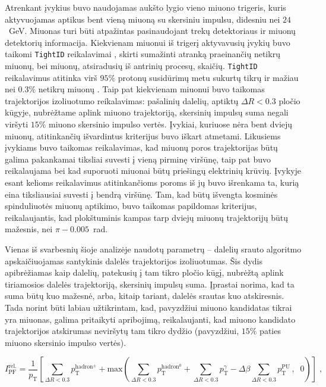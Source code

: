 \documentclass[a4paper, 12pt, oneside]{article}
\newcommand{\ttt}[1]{\texttt{#1}}
\newlength\q
\begin{document}
Atrenkant įvykius buvo naudojamas aukšto lygio vieno miuono trigeris, kuris aktyvuojamas aptikus bent vieną
miuoną su skersiniu impulsu, didesniu nei $24$~GeV.
Miuonas turi būti atpažintas pasinaudojant trekų detektoriaus ir miuonų detektorių informacija.
Kiekvienam miuonui iš trigerį aktyvavusių įvykių buvo taikomi \ttt{TightID} reikalavimai \cite{MuonID}, skirti sumažinti atranką
praeinančių netikrų miuonų, bei miuonų, atsiradusių iš antrinių procesų, skaičių.
\ttt{TightID} reikalavimus atitinka virš $95\%$ protonų susidūrimų metu sukurtų tikrų ir mažiau nei $0.3\%$ netikrų
miuonų \cite{MuonID}.
Taip pat kiekvienam miuonui buvo taikomas trajektorijos izoliuotumo reikalavimas: pašalinių dalelių, aptiktų
$\Delta R < 0.3$ pločio kūgyje, nubrėžtame aplink miuono trajektoriją, skersinių impulsų suma negali
viršyti $15\%$ miuono skersinio impulso vertės.
Įvykiai, kuriuose nėra bent dviejų miuonų, atitinkančių išvardintus kriterijus buvo iškart atmetami.
Likusiems įvykiams buvo taikomas reikalavimas, kad miuonų poros trajektorijas būtų galima pakankamai tiksliai
suvesti į vieną pirminę
viršūnę, taip pat buvo reikalaujama bei kad suporuoti miuonai būtų priešingų elektrinių krūvių.
Įvykyje esant kelioms reikalavimus atitinkančioms poroms iš jų buvo išrenkama ta, kurią eina tiksliausiai suvesti į bendrą viršūnę.
Tam, kad būtų išvengta kosminės spinduliuotės miuonų aptikimo, buvo taikomas papildomas kriterijus, reikalaujantis,
kad plokštuminis kampas tarp dviejų miuonų trajektorijų būtų mažesnis, nei $\pi-0.005$~rad.

Vienas iš svarbesnių šioje analizėje naudotų parametrų -- dalelių srauto algoritmo apskaičiuojamas santykinis
dalelės trajektorijos izoliuotumas.
Šis dydis apibrėžiamas kaip dalelių, patekusių į tam tikro pločio kūgį, nubrėžtą aplink tiriamosios
dalelės trajektoriją, skersinių impulsų suma.
Įprastai norima, kad ta suma būtų kuo mažesnė, arba, kitaip tariant, dalelės srautas kuo atskiresnis.
Tada norint būti labiau užtikrintam, kad, pavyzdžiui miuono kandidatas tikrai yra miuonas, galima
pritaikyti apribojimą, reikalaujanti, kad miuono kandidato trajektorijos atskirumas neviršytų tam tikro dydžio
(pavyzdžiui, $15\%$ paties miuono skersinio impulso vertės).

\begin{equation}
	\label{eq:isolation}
	I^{\mathrm{rel.}}_{\mathrm{PF}} = \frac{1}{p_{\mathrm{T}}} 
	\left[ \sum_{\Delta R<0.3} p_{\mathrm{T}}^{\mathrm{hadron^{\pm}}} +
	\mathrm{max} \left( \sum_{\Delta R<0.3} p_{\mathrm{T}}^{\mathrm{hadron^0}} + 
	\sum_{\Delta R<0.3} p_{\mathrm{T}}^{\gamma} -
	\Delta \beta \sum_{\Delta R<0.3} p_{\mathrm{T}}^{\mathrm{PU}}
	\, ,\;\; 0 \right) \right] \; \mathrm{,}
\end{equation}
\end{document}
